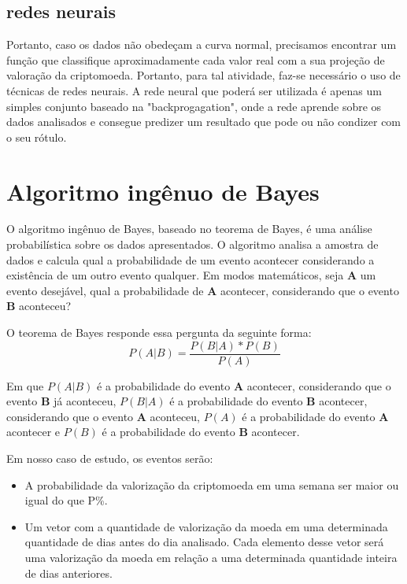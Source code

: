 \documentclass[conference]{IEEEtran}
\begin{document}
\subsection{redes neurais}
Portanto, caso os dados não obedeçam a curva normal, precisamos encontrar um função que classifique aproximadamente cada valor real com a sua projeção de valoração da criptomoeda. Portanto, para tal atividade, faz-se necessário o uso de técnicas de redes neurais. A rede neural que poderá ser utilizada é apenas um simples conjunto baseado na "backprogagation", onde a rede aprende sobre os dados analisados e consegue predizer um resultado que pode ou não condizer com o seu rótulo.

\section{Algoritmo ingênuo de Bayes}

O algoritmo ingênuo de Bayes, baseado no teorema de Bayes, é uma análise probabilística sobre os dados apresentados. O algoritmo analisa a amostra de dados e calcula qual a probabilidade de um evento acontecer considerando a existência de um outro evento qualquer. Em modos matemáticos, seja \textbf{A} um evento desejável, qual a probabilidade de \textbf{A} acontecer, considerando que o evento \textbf{B} aconteceu?

O teorema de Bayes responde essa pergunta da seguinte forma:
\begin{equation}
    P(A|B) = \frac{P(B|A)*P(B)}{P(A)}
\end{equation}

Em que \(P(A|B)\) é a probabilidade do evento \textbf{A} acontecer, considerando que o evento \textbf{B} já aconteceu, \(P(B|A)\) é a probabilidade do evento \textbf{B} acontecer, considerando que o evento \textbf{A} aconteceu, \(P(A)\) é a probabilidade do evento \textbf{A} acontecer e \(P(B)\) é a probabilidade do evento \textbf{B} acontecer.

Em nosso caso de estudo, os eventos serão:

\begin{itemize}
    \item A probabilidade da valorização da criptomoeda em uma semana ser maior ou igual do que P\%.
    \item Um vetor com a quantidade de valorização da moeda em uma determinada quantidade de dias antes do dia analisado. Cada elemento desse vetor será uma valorização da moeda em relação a uma determinada quantidade inteira de dias anteriores.
\end{itemize}
\end{document}
